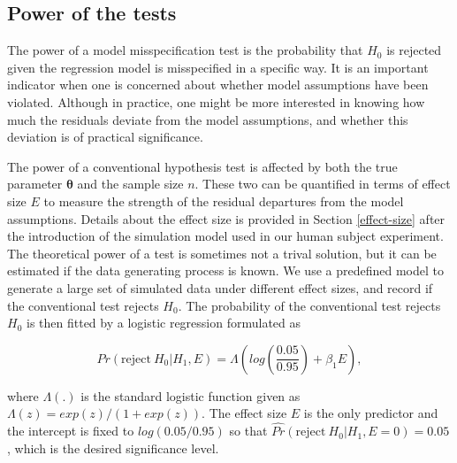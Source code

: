 \documentclass[]{interact}
\theoremstyle{plain}%
\theoremstyle{definition}
\theoremstyle{remark}
\begin{document}
\hypertarget{power-of-the-tests}{%
\subsection{Power of the tests}\label{power-of-the-tests}}

The power of a model misspecification test is the probability that
\(H_0\) is rejected given the regression model is misspecified in a
specific way. It is an important indicator when one is concerned about
whether model assumptions have been violated. Although in practice, one
might be more interested in knowing how much the residuals deviate from
the model assumptions, and whether this deviation is of practical
significance.

The power of a conventional hypothesis test is affected by both the true
parameter \(\boldsymbol{\theta}\) and the sample size \(n\). These two
can be quantified in terms of effect size \(E\) to measure the strength
of the residual departures from the model assumptions. Details about the
effect size is provided in Section \ref{effect-size} after the
introduction of the simulation model used in our human subject
experiment. The theoretical power of a test is sometimes not a trival
solution, but it can be estimated if the data generating process is
known. We use a predefined model to generate a large set of simulated
data under different effect sizes, and record if the conventional test
rejects \(H_0\). The probability of the conventional test rejects
\(H_0\) is then fitted by a logistic regression formulated as

\begin{equation} \label{eq:logistic-regression-1-1}
Pr(\text{reject}~H_0|H_1,E) = \Lambda\left(log\left(\frac{0.05}{0.95}\right) + \beta_1 E\right),
\end{equation}

\noindent where \(\Lambda(.)\) is the standard logistic function given
as \(\Lambda(z) = exp(z)/(1+exp(z))\). The effect size \(E\) is the only
predictor and the intercept is fixed to \(log(0.05/0.95)\) so that
\(\hat{Pr}(\text{reject}~H_0|H_1,E = 0) = 0.05\), which is the desired
significance level.
\end{document}
